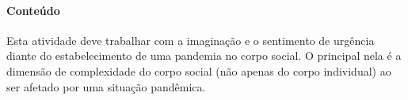 \documentclass[12pt]{extarticle}
\begin{document}



\paragraph{Conteúdo}

Esta atividade deve trabalhar com a imaginação e o sentimento de
urgência diante do estabelecimento de uma pandemia no corpo social. O
principal nela é a dimensão de complexidade do corpo social (não apenas
do corpo individual) ao ser afetado por uma situação pandêmica.
\end{document}
